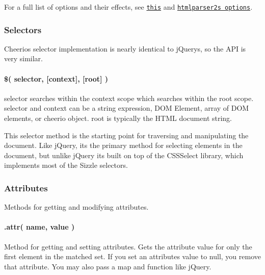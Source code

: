 For a full list of options and their effects, see \href{https://github.com/fb55/DomHandler}{\tt this} and \href{https://github.com/fb55/htmlparser2/wiki/Parser-options}{\tt htmlparser2\textquotesingle{}s options}.

\subsubsection*{Selectors}

Cheerio\textquotesingle{}s selector implementation is nearly identical to j\+Query\textquotesingle{}s, so the A\+PI is very similar.

\paragraph*{\$( selector, \mbox{[}context\mbox{]}, \mbox{[}root\mbox{]} )}

{\ttfamily selector} searches within the {\ttfamily context} scope which searches within the {\ttfamily root} scope. {\ttfamily selector} and {\ttfamily context} can be a string expression, D\+OM Element, array of D\+OM elements, or cheerio object. {\ttfamily root} is typically the H\+T\+ML document string.

This selector method is the starting point for traversing and manipulating the document. Like j\+Query, it\textquotesingle{}s the primary method for selecting elements in the document, but unlike j\+Query it\textquotesingle{}s built on top of the C\+S\+S\+Select library, which implements most of the Sizzle selectors.




\subsubsection*{Attributes}

Methods for getting and modifying attributes.

\paragraph*{.attr( name, value )}

Method for getting and setting attributes. Gets the attribute value for only the first element in the matched set. If you set an attribute\textquotesingle{}s value to {\ttfamily null}, you remove that attribute. You may also pass a {\ttfamily map} and {\ttfamily function} like j\+Query.


